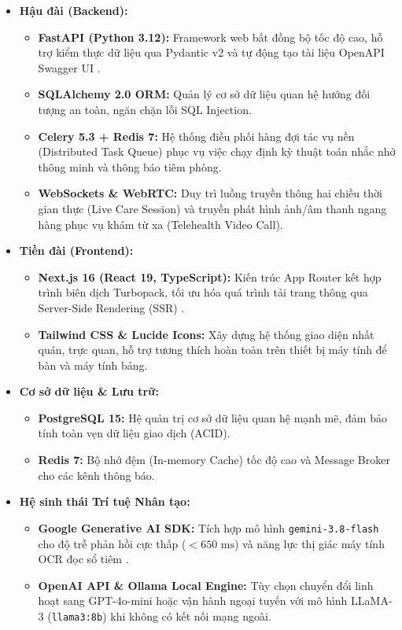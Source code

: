 \begin{itemize}[leftmargin=1.5cm]
    \item \textbf{Hậu đài (Backend):}
    \begin{itemize}
        \item \textbf{FastAPI (Python 3.12):} Framework web bất đồng bộ tốc độ cao, hỗ trợ kiểm thực dữ liệu qua Pydantic v2 và tự động tạo tài liệu OpenAPI Swagger UI \cite{ramirez2024fastapi}.
        \item \textbf{SQLAlchemy 2.0 ORM:} Quản lý cơ sở dữ liệu quan hệ hướng đối tượng an toàn, ngăn chặn lỗi SQL Injection.
        \item \textbf{Celery 5.3 + Redis 7:} Hệ thống điều phối hàng đợi tác vụ nền (Distributed Task Queue) phục vụ việc chạy định kỳ thuật toán nhắc nhở thông minh và thông báo tiêm phòng.
        \item \textbf{WebSockets \& WebRTC:} Duy trì luồng truyền thông hai chiều thời gian thực (Live Care Session) và truyền phát hình ảnh/âm thanh ngang hàng phục vụ khám từ xa (Telehealth Video Call).
    \end{itemize}
    \item \textbf{Tiền đài (Frontend):}
    \begin{itemize}
        \item \textbf{Next.js 16 (React 19, TypeScript):} Kiến trúc App Router kết hợp trình biên dịch Turbopack, tối ưu hóa quá trình tải trang thông qua Server-Side Rendering (SSR) \cite{nextjs2024}.
        \item \textbf{Tailwind CSS \& Lucide Icons:} Xây dựng hệ thống giao diện nhất quán, trực quan, hỗ trợ tương thích hoàn toàn trên thiết bị máy tính để bàn và máy tính bảng.
    \end{itemize}
    \item \textbf{Cơ sở dữ liệu \& Lưu trữ:}
    \begin{itemize}
        \item \textbf{PostgreSQL 15:} Hệ quản trị cơ sở dữ liệu quan hệ mạnh mẽ, đảm bảo tính toàn vẹn dữ liệu giao dịch (ACID).
        \item \textbf{Redis 7:} Bộ nhớ đệm (In-memory Cache) tốc độ cao và Message Broker cho các kênh thông báo.
    \end{itemize}
    \item \textbf{Hệ sinh thái Trí tuệ Nhân tạo:}
    \begin{itemize}
        \item \textbf{Google Generative AI SDK:} Tích hợp mô hình \texttt{gemini-3.8-flash} cho độ trễ phản hồi cực thấp ($<650\text{ ms}$) và năng lực thị giác máy tính OCR đọc sổ tiêm \cite{gemini2023}.
        \item \textbf{OpenAI API \& Ollama Local Engine:} Tùy chọn chuyển đổi linh hoạt sang GPT-4o-mini hoặc vận hành ngoại tuyến với mô hình LLaMA-3 (\texttt{llama3:8b}) khi không có kết nối mạng ngoài.
    \end{itemize}
\end{itemize}

